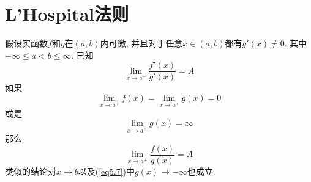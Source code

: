 \documentclass[cn,12pt,math=mtpro2,citestyle=gb7714-2015,bibstyle=gb7714-2015,twocol]{elegantbook}
\begin{document}
\section{L'Hospital法则}
\begin{theorem}
  假设实函数$f$和$g$在$(a,b)$内可微, 并且对于任意$x\in(a,b)$都有$g'(x)\neq0$. 其中$-\infty\leq a<b\leq \infty$. 已知
  \begin{equation}\label{eq5.5}
    \lim_{x\to a^+}\frac{f'(x)}{g'(x)}=A
  \end{equation}
  如果
    \begin{equation}\label{eq5.6}
     \lim_{x\to a^+}f(x)= \lim_{x\to a^+}g(x)=0
  \end{equation}
  或是
    \begin{equation}\label{eq5.7}
     \lim_{x\to a^+}g(x)=\infty
  \end{equation}
  那么
    \begin{equation}\label{eq5.8}
     \lim_{x\to a^+}\frac{f(x)}{g(x)}=A
  \end{equation}
  类似的结论对$x\rightarrow b$以及(\ref{eq5.7})中$g(x)\rightarrow-\infty$也成立.
\end{theorem}
\end{document}
